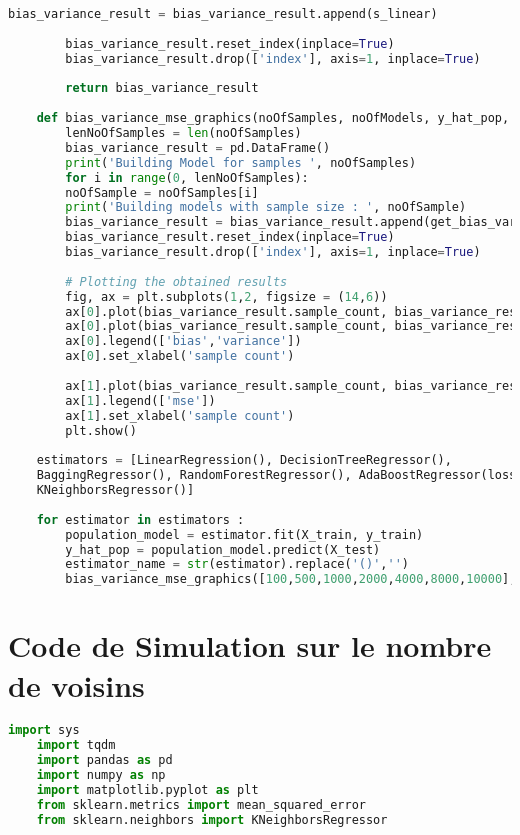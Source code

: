\documentclass[a4paper]{article}
\begin{document}
\begin{appendices}
\begin{lstlisting}[language=Python, basicstyle=\small]
		bias_variance_result = bias_variance_result.append(s_linear)
		
		bias_variance_result.reset_index(inplace=True)
		bias_variance_result.drop(['index'], axis=1, inplace=True)
		
		return bias_variance_result
	
	def bias_variance_mse_graphics(noOfSamples, noOfModels, y_hat_pop, estimator_name, estimator) :
		lenNoOfSamples = len(noOfSamples)
		bias_variance_result = pd.DataFrame()
		print('Building Model for samples ', noOfSamples)
		for i in range(0, lenNoOfSamples):
		noOfSample = noOfSamples[i]
		print('Building models with sample size : ', noOfSample)
		bias_variance_result = bias_variance_result.append(get_bias_variance(noOfSample,noOfModels, y_hat_pop, estimator_name, 	estimator))
		bias_variance_result.reset_index(inplace=True)
		bias_variance_result.drop(['index'], axis=1, inplace=True)
		
		# Plotting the obtained results
		fig, ax = plt.subplots(1,2, figsize = (14,6))
		ax[0].plot(bias_variance_result.sample_count, bias_variance_result.bias)
		ax[0].plot(bias_variance_result.sample_count, bias_variance_result.variance)
		ax[0].legend(['bias','variance'])
		ax[0].set_xlabel('sample count')
		
		ax[1].plot(bias_variance_result.sample_count, bias_variance_result.mse)
		ax[1].legend(['mse'])
		ax[1].set_xlabel('sample count')
		plt.show()
	
	estimators = [LinearRegression(), DecisionTreeRegressor(),
	BaggingRegressor(), RandomForestRegressor(), AdaBoostRegressor(loss='square'),
	KNeighborsRegressor()]
	
	for estimator in estimators : 
		population_model = estimator.fit(X_train, y_train)
		y_hat_pop = population_model.predict(X_test)
		estimator_name = str(estimator).replace('()','')
		bias_variance_mse_graphics([100,500,1000,2000,4000,8000,10000], 20, y_hat_pop, estimator_name, estimator)
\end{lstlisting}

\newpage

\section{Code de Simulation sur le nombre de voisins}

\begin{lstlisting}[language=Python]
	import sys
	import tqdm
	import pandas as pd
	import numpy as np
	import matplotlib.pyplot as plt
	from sklearn.metrics import mean_squared_error
	from sklearn.neighbors import KNeighborsRegressor
	

\end{lstlisting}
\end{appendices}
\end{document}
